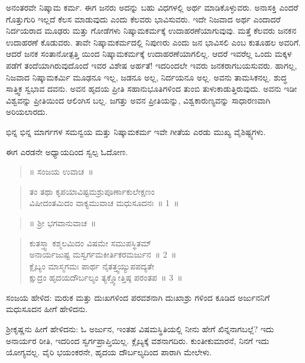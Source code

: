 ಅನಂತರವೇ ನಿಷ್ಕಾಮ ಕರ್ಮ. ಈಗ ಜನರು ಅದನ್ನು ಬಹು ವಿಧಗಳಲ್ಲಿ ಅರ್ಥ ಮಾಡಿಕೊಳ್ಳುವರು. ಅನಾಸಕ್ತಿ ಎಂದರೆ ಗೊತ್ತುಗುರಿ ಇಲ್ಲದೆ ಕೆಲಸ ಮಾಡುವುದು ಎಂದು ಕೆಲವರು ಭಾವಿಸುವರು. ಇದೇ ನಿಜವಾದ ಅರ್ಥ ಎಂದಾದರೆ ನಿರ್ದಯರಾದ ಮೂಢರು ಮತ್ತು ಗೋಡೆಗಳು ನಿಷ್ಕಾಮಕರ್ಮಕ್ಕೆ ಉದಾಹರಣೆಯಾಗುವುವು. ಮತ್ತೆ ಕೆಲವರು ಜನಕನ ಉದಾಹರಣೆ ಕೊಡುವರು. ತಾವೇ ನಿಷ್ಕಾಮಕರ್ಮದಲ್ಲಿ ನಿಪುಣರು ಎಂದು ಜನ ಭಾವಿಸಲಿ ಎಂಬ ಕುತೂಹಲ ಅವರಿಗೆ. ಆದರೆ ಜನಕ ಸಂತಾನೋತ್ಪತ್ತಿ ಯಿಂದ ನಿಷ್ಕಾಮಕರ್ಮಕ್ಕೆ ಉದಾಹರಣೆಯಾಗಲಿಲ್ಲ. ಆದರೆ ಇವರೆಲ್ಲ ಒಂದು ಮಕ್ಕಳ ಪಡೆಗೆ ತಂದೆಯಾಗಿರುವುದೊಂದೆ ಇವರ ವಿಶೇಷ ಅರ್ಹತೆ! ಇದರಿಂದಲೇ ಇವರು ಜನಕರಾಗಬಯಸುವರು. ಹಾಗಲ್ಲ, ನಿಜವಾದ ನಿಷ್ಕಾಮಕರ್ಮಿ ಮೂಢನೂ ಇಲ್ಲ, ಜಡನೂ ಅಲ್ಲ, ನಿರ್ದಯನೂ ಅಲ್ಲ. ಅವನು ತಾಮಸಿಕನಲ್ಲ. ಶುದ್ಧ ಸಾತ್ತ್ವಿಕ ಸ್ವಭಾವ ದವನು. ಅವನ ಹೃದಯ ಪ್ರೀತಿ ಸಹಾನುಭೂತಿಗಳಿಂದ ತುಂಬಿ ತುಳುಕಾಡುತ್ತಿರುವುದು. ಅವನು ಇಡೀ ವಿಶ್ವವನ್ನು ಪ್ರೀತಿಯಿಂದ ಆಲಿಂಗಿಸ ಬಲ್ಲ. ಜಗತ್ತು ಅವನ ಪ್ರೀತಿಯನ್ನು, ವಿಶ್ವಕಾರುಣ್ಯವನ್ನು ಸಾಧಾರಣವಾಗಿ ಅರಿಯಲಾರದು.

ಭಿನ್ನ ಭಿನ್ನ ಮಾರ್ಗಗಳ ಸಮನ್ವಯ ಮತ್ತು ನಿಷ್ಕಾಮಕರ್ಮ ಇವೇ ಗೀತೆಯ ಎರಡು ಮುಖ್ಯ ವೈಶಿಷ್ಟ್ಯಗಳು.

ಈಗ ಎರಡನೇ ಅಧ್ಯಾಯದಿಂದ ಸ್ವಲ್ಪ ಓದೋಣ.

\begin{verse}
॥ ಸಂಜಯ ಉವಾಚ~॥
\end{verse}

\begin{verse}
ತಂ ತಥಾ ಕೃಪಯಾವಿಷ್ಟಮಶ್ರುಪೂರ್ಣಾಕುಲೇಕ್ಷಣಂ\\ವಿಷೀದಂತಮಿದಂ ವಾಕ್ಯಮುವಾಚ ಮಧುಸೂದನಃ~॥ 1~॥
\end{verse}

\begin{verse}
॥ ಶ‍್ರೀ ಭಗವಾನುವಾಚ~॥
\end{verse}

\begin{verse}
ಕುತಸ್ತ್ವಾ ಕಶ್ಮಲಮಿದಂ ವಿಷಮೇ ಸಮುಪಸ್ಥಿತಮ್​\\ಅನಾರ್ಯಜುಷ್ಟ ಮಸ್ವರ್ಗಮಕೀರ್ತಿಕರಮರ್ಜುನ~॥ 2~॥\\ಕ್ಲೈಬ್ಯಂ ಮಾಸ್ಮಗಮಃ ಪಾರ್ಥ ನೈತತ್ತ್ವಯ್ಯುಪಪದ್ಯತೇ\\ಕ್ಷುದ್ರಂ ಹೃದಯದೌರ್ಬಲ್ಯಂ ತ್ಯಕ್ತ್ವೋತ್ತಿಷ್ಠ ಪರಂತಪ~॥ 3~॥
\end{verse}

\vskip 0.3cm

ಸಂಜಯ ಹೇಳಿದ: ಮರುಕ ಮತ್ತು ದುಃಖಗಳಿಂದ ಪರವಶನಾಗಿ ದುಃಖಾಶ್ರು ಗಳಿಂದ ಕೂಡಿದ ಅರ್ಜುನನಿಗೆ ಮಧುಸೂದನ ಹೀಗೆ ಹೇಳಿದನು.

\vskip 0.3cm

ಶ‍್ರೀಕೃಷ್ಣನು ಹೀಗೆ ಹೇಳಿದನು: ಓ ಅರ್ಜುನ, ಇಂತಹ ವಿಷಮಸ್ಥಿತಿಯಲ್ಲಿ ನೀನು ಹೇಗೆ ಖಿನ್ನನಾಗಬಲ್ಲೆ? ಇದು ಅನಾರ್ಯರ ರೀತಿ, ಇದರಿಂದ ಸ್ವರ್ಗಪ್ರಾಪ್ತಿಯಿಲ್ಲ. ಕ್ಲೈಬ್ಯಕ್ಕೆ ವಶನಾಗದಿರು. ಕುಂತೀಕುಮಾರನೆ, ನಿನಗೆ ಇದು ಯೋಗ್ಯವಲ್ಲ. ವೈರಿ ಭಯಂಕರನೇ, ಹೃದಯ ದೌರ್ಬಲ್ಯದಿಂದ ಪಾರಾಗಿ ಮೇಲೇಳು.

\vskip 0.3cm

